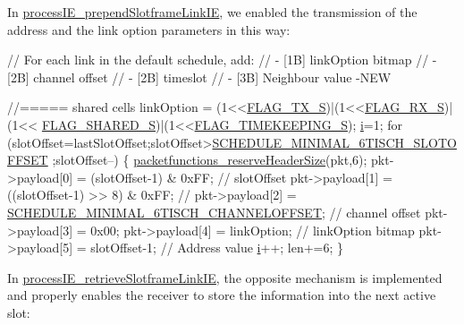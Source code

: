 In \hyperlink{process_i_e_8h_a222b2d57ad09b945b098f211cd159e53}{process\+I\+E\+\_\+prepend\+Slotframe\+Link\+IE}, we enabled the transmission of the address and the link option parameters in this way\+: 
\begin{DoxyCodeInclude}
   
   \textcolor{comment}{// For each link in the default schedule, add:}
   \textcolor{comment}{// - [1B] linkOption bitmap}
   \textcolor{comment}{// - [2B] channel offset}
   \textcolor{comment}{// - [2B] timeslot}
   \textcolor{comment}{// - [3B] Neighbour value -NEW}
 
   \textcolor{comment}{//===== shared cells}
   linkOption = (1<<\hyperlink{group___i_e_e_e802154_e_ggaa8d5243a5473317d5e534e093d0842d2ad2ad324754167c22e203d395ab806743}{FLAG\_TX\_S})|(1<<\hyperlink{group___i_e_e_e802154_e_ggaa8d5243a5473317d5e534e093d0842d2a5c0f22602ca83af1733a5e18a7e6f20f}{FLAG\_RX\_S})|(1<<
      \hyperlink{group___i_e_e_e802154_e_ggaa8d5243a5473317d5e534e093d0842d2a60b8f45b435950f10cb9d755e09fa295}{FLAG\_SHARED\_S})|(1<<\hyperlink{group___i_e_e_e802154_e_ggaa8d5243a5473317d5e534e093d0842d2aeea4c693b0c82c42470264523a1c2656}{FLAG\_TIMEKEEPING\_S});
   \hyperlink{pmc_8c_acb559820d9ca11295b4500f179ef6392}{i}=1;
   \textcolor{keywordflow}{for} (slotOffset=lastSlotOffset;slotOffset>\hyperlink{group___schedule_ga62c64cb1c9bbbb2927f358c14535fb7f}{SCHEDULE\_MINIMAL\_6TISCH\_SLOTOFFSET}
      ;slotOffset--) \{
      \hyperlink{group___packet_functions_ga690ad87588077409f382584732259925}{packetfunctions\_reserveHeaderSize}(pkt,6);
      pkt->payload[0]   = (slotOffset-1)        & 0xFF;             \textcolor{comment}{// slotOffset}
      pkt->payload[1]   = ((slotOffset-1) >> 8) & 0xFF;             \textcolor{comment}{//}
      pkt->payload[2]   = \hyperlink{group___schedule_ga485a603a3e03059901c4fc5fc968a1e9}{SCHEDULE\_MINIMAL\_6TISCH\_CHANNELOFFSET};    \textcolor{comment}{//
       channel offset}
      pkt->payload[3]   = 0x00;
      pkt->payload[4]   = linkOption;                               \textcolor{comment}{// linkOption bitmap}
      pkt->payload[5]   = slotOffset-1;                             \textcolor{comment}{// Address value}
      \hyperlink{pmc_8c_acb559820d9ca11295b4500f179ef6392}{i}++;
      len+=6;
   \}
\end{DoxyCodeInclude}
 In \hyperlink{process_i_e_8h_a41d90fd25e8ce294b9d7632d43089c80}{process\+I\+E\+\_\+retrieve\+Slotframe\+Link\+IE}, the opposite mechanism is implemented and properly enables the receiver to store the information into the next active slot\+: 
